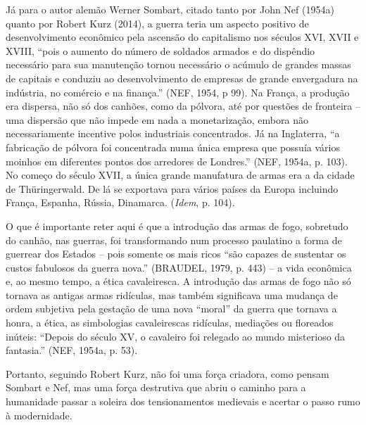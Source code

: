 Já para o autor alemão Werner Sombart, citado tanto por John Nef (1954a)
quanto por Robert Kurz (2014), a guerra teria um aspecto positivo de
desenvolvimento econômico pela ascensão do capitalismo nos séculos XVI,
XVII e XVIII, ``pois o aumento do número de soldados armados e do
dispêndio necessário para sua manutenção tornou necessário o acúmulo de
grandes massas de capitais e conduziu ao desenvolvimento de empresas de
grande envergadura na indústria, no comércio e na finança.'' (NEF, 1954,
p 99). Na França, a produção era dispersa, não só dos canhões, como da
pólvora, até por questões de fronteira -- uma dispersão que não impede
em nada a monetarização, embora não necessariamente incentive polos
industriais concentrados. Já na Inglaterra, ``a fabricação de pólvora
foi concentrada numa única empresa que possuía vários moinhos em
diferentes pontos dos arredores de Londres.'' (NEF, 1954a, p. 103). No
começo do século XVII, a única grande manufatura de armas era a da
cidade de Thüringerwald. De lá se exportava para vários países da Europa
incluindo França, Espanha, Rússia, Dinamarca. (\emph{Idem}, p. 104).

O que é importante reter aqui é que a introdução das armas de fogo,
sobretudo do canhão, nas guerras, foi transformando num processo
paulatino a forma de guerrear dos Estados -- pois somente os mais ricos
``são capazes de sustentar os custos fabulosos da guerra nova.''
(BRAUDEL, 1979, p. 443) -- a vida econômica e, ao mesmo tempo, a ética
cavaleiresca. A introdução das armas de fogo não só tornava as antigas
armas ridículas, mas também significava uma mudança de ordem subjetiva
pela gestação de uma nova ``moral'' da guerra que tornava a honra, a
ética, as simbologias cavaleirescas ridículas, mediações ou floreados
inúteis: ``Depois do século XV, o cavaleiro foi relegado ao mundo
misterioso da fantasia.'' (NEF, 1954a, p. 53).

Portanto, seguindo Robert Kurz, não foi uma força criadora, como pensam
Sombart e Nef, mas uma força destrutiva que abriu o caminho para a
humanidade passar a soleira dos tensionamentos medievais e acertar o
passo rumo à modernidade.

